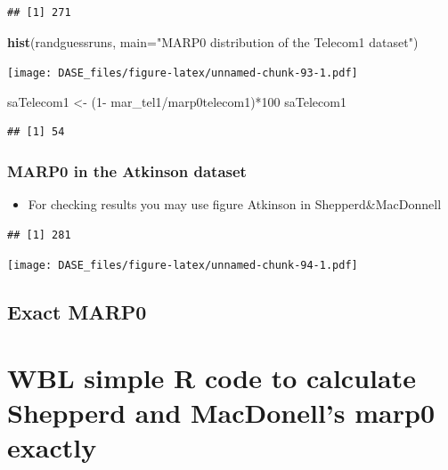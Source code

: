 \documentclass[]{book}
\newenvironment{Shaded}{\begin{snugshade}}{\end{snugshade}}
\newcommand{\KeywordTok}[1]{\textcolor[rgb]{0.13,0.29,0.53}{\textbf{{#1}}}}
\newcommand{\DataTypeTok}[1]{\textcolor[rgb]{0.13,0.29,0.53}{{#1}}}
\newcommand{\DecValTok}[1]{\textcolor[rgb]{0.00,0.00,0.81}{{#1}}}
\newcommand{\StringTok}[1]{\textcolor[rgb]{0.31,0.60,0.02}{{#1}}}
\newcommand{\NormalTok}[1]{{#1}}
\providecommand{\tightlist}{%
  \setlength{\itemsep}{0pt}\setlength{\parskip}{0pt}}
\begin{document}
\begin{verbatim}
## [1] 271
\end{verbatim}

\begin{Shaded}
\begin{Highlighting}[]
\KeywordTok{hist}\NormalTok{(randguessruns, }\DataTypeTok{main=}\StringTok{"MARP0 distribution of the Telecom1 dataset"}\NormalTok{)}
\end{Highlighting}
\end{Shaded}

\texttt{[image: DASE\_files/figure-latex/unnamed-chunk-93-1.pdf]}

\begin{Shaded}
\begin{Highlighting}[]
\NormalTok{saTelecom1 <-}\StringTok{ }\NormalTok{(}\DecValTok{1}\NormalTok{-}\StringTok{ }\NormalTok{mar_tel1/marp0telecom1)*}\DecValTok{100}
\NormalTok{saTelecom1}
\end{Highlighting}
\end{Shaded}

\begin{verbatim}
## [1] 54
\end{verbatim}

\subsection{MARP0 in the Atkinson
dataset}\label{marp0-in-the-atkinson-dataset}

\begin{itemize}
\tightlist
\item
  For checking results you may use figure Atkinson in
  Shepperd\&MacDonnell
\end{itemize}

\begin{verbatim}
## [1] 281
\end{verbatim}

\texttt{[image: DASE\_files/figure-latex/unnamed-chunk-94-1.pdf]}

\section{Exact MARP0}\label{exact-marp0}

\chapter{WBL simple R code to calculate Shepperd and MacDonell's marp0
exactly}\label{wbl-simple-r-code-to-calculate-shepperd-and-macdonells-marp0-exactly}
\end{document}
